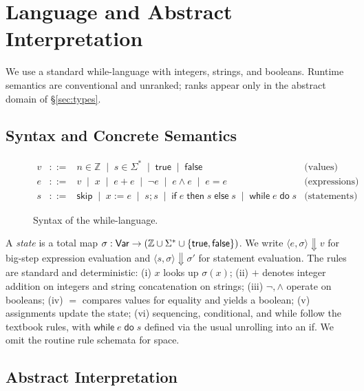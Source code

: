 \section{Language and Abstract Interpretation}
\label{sec:lang-ai}

We use a standard \textsf{while}-language with integers, strings, and booleans. Runtime semantics are conventional and unranked; ranks appear only in the abstract domain of \S\ref{sec:types}.

\subsection{Syntax and Concrete Semantics}

\begin{figure}[t]
\centering
\[
\begin{array}{rcll}
v &::=& n \in \mathbb{Z} \;\mid\; s \in \Sigma^* \;\mid\; \mathsf{true} \;\mid\; \mathsf{false} & \text{(values)}\\[1pt]
e &::=& v \;\mid\; x \;\mid\; e{+}e \;\mid\; \neg e \;\mid\; e \wedge e \;\mid\; e {=} e & \text{(expressions)}\\[1pt]
s &::=& \mathsf{skip} \;\mid\; x {:=} e \;\mid\; s; s \;\mid\; \mathsf{if}\; e\;\mathsf{then}\; s\;\mathsf{else}\; s \;\mid\; \mathsf{while}\; e\;\mathsf{do}\; s & \text{(statements)}
\end{array}
\]
\vspace{-2mm}
\caption{Syntax of the \textsf{while}-language.}
\label{fig:syntax-while}
\end{figure}

A \emph{state} is a total map $\sigma: \mathsf{Var} \to (\mathbb{Z}\cup\Sigma^*\cup\{\mathsf{true},\mathsf{false}\})$.
We write $\langle e,\sigma\rangle \Downarrow v$ for big-step expression evaluation and
$\langle s,\sigma\rangle \Downarrow \sigma'$ for statement evaluation. The rules are standard and deterministic:
(i) $x$ looks up $\sigma(x)$; (ii) $+$ denotes integer addition on integers and string concatenation on strings;
(iii) $\neg,\wedge$ operate on booleans; (iv) $=$ compares values for equality and yields a boolean; (v) assignments update the state; (vi) sequencing, conditional, and while follow the textbook rules, with $\mathsf{while}\;e\;\mathsf{do}\;s$ defined via the usual unrolling into an \textsf{if}.
We omit the routine rule schemata for space.

\subsection{Abstract Interpretation}


